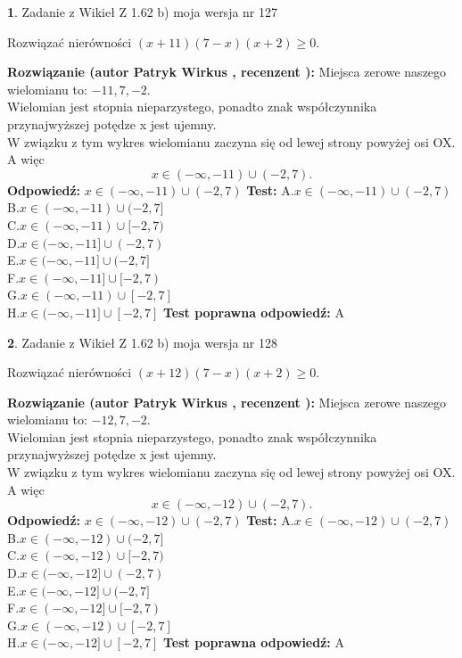 \documentclass[12pt, a4paper]{article}
\theoremstyle{definition} %
\newtheorem{zad}{}
\newcommand{\zadStart}[1]{\begin{zad}#1\newline}
\newcommand{\zadStop}{\end{zad}}
\newcommand{\rozwStart}[2]{\noindent \textbf{Rozwiązanie (autor #1 , recenzent #2): }\newline}
\newcommand{\rozwStop}{\newline}
\newcommand{\odpStart}{\noindent \textbf{Odpowiedź:}\newline}
\newcommand{\odpStop}{\newline}
\newcommand{\testStart}{\noindent \textbf{Test:}\newline}
\newcommand{\testStop}{\newline}
\newcommand{\kluczStart}{\noindent \textbf{Test poprawna odpowiedź:}\newline}
\newcommand{\kluczStop}{\newline}
\begin{document}
\zadStart{Zadanie z Wikieł Z 1.62 b) moja wersja nr 127}

Rozwiązać nierówności $(x+11)(7-x)(x+2)\ge0$.
\zadStop
\rozwStart{Patryk Wirkus}{}
Miejsca zerowe naszego wielomianu to: $-11, 7, -2$.\\
Wielomian jest stopnia nieparzystego, ponadto znak współczynnika przy\linebreak najwyższej potędze x jest ujemny.\\ W związku z tym wykres wielomianu zaczyna się od lewej strony powyżej osi OX. A więc $$x \in (-\infty,-11) \cup (-2,7).$$
\rozwStop
\odpStart
$x \in (-\infty,-11) \cup (-2,7)$
\odpStop
\testStart
A.$x \in (-\infty,-11) \cup (-2,7)$\\
B.$x \in (-\infty,-11) \cup (-2,7]$\\
C.$x \in (-\infty,-11) \cup [-2,7)$\\
D.$x \in (-\infty,-11] \cup (-2,7)$\\
E.$x \in (-\infty,-11] \cup (-2,7]$\\
F.$x \in (-\infty,-11] \cup [-2,7)$\\
G.$x \in (-\infty,-11) \cup [-2,7]$\\
H.$x \in (-\infty,-11] \cup [-2,7]$
\testStop
\kluczStart
A
\kluczStop



\zadStart{Zadanie z Wikieł Z 1.62 b) moja wersja nr 128}

Rozwiązać nierówności $(x+12)(7-x)(x+2)\ge0$.
\zadStop
\rozwStart{Patryk Wirkus}{}
Miejsca zerowe naszego wielomianu to: $-12, 7, -2$.\\
Wielomian jest stopnia nieparzystego, ponadto znak współczynnika przy\linebreak najwyższej potędze x jest ujemny.\\ W związku z tym wykres wielomianu zaczyna się od lewej strony powyżej osi OX. A więc $$x \in (-\infty,-12) \cup (-2,7).$$
\rozwStop
\odpStart
$x \in (-\infty,-12) \cup (-2,7)$
\odpStop
\testStart
A.$x \in (-\infty,-12) \cup (-2,7)$\\
B.$x \in (-\infty,-12) \cup (-2,7]$\\
C.$x \in (-\infty,-12) \cup [-2,7)$\\
D.$x \in (-\infty,-12] \cup (-2,7)$\\
E.$x \in (-\infty,-12] \cup (-2,7]$\\
F.$x \in (-\infty,-12] \cup [-2,7)$\\
G.$x \in (-\infty,-12) \cup [-2,7]$\\
H.$x \in (-\infty,-12] \cup [-2,7]$
\testStop
\kluczStart
A
\kluczStop
\end{document}
